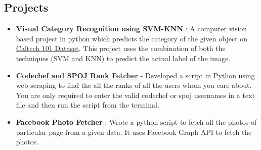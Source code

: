 \documentclass[margin, centered]{res}
\begin{document}
\begin{resume}
\section{Projects}
\begin{itemize}[leftmargin=*]
 \item \textbf{Visual Category Recognition using SVM-KNN} : A computer vision based project in python which predicts the category of the given object on \href {https://www.vision.caltech.edu/Image_Datasets/Caltech101/}{Caltech 101 Dataset}. This project uses the combination of both the techniques (SVM and KNN) to predict the actual label of the image.
 \item \textbf{\href{https://github.com/nickzuck}{Codechef and SPOJ Rank Fetcher}} - Developed a script in Python using web scraping to find the all the ranks of all the users whom you care about. You are only required to enter the valid codechef or spoj usernames in a text file and then run the script from the terminal.
 \item \textbf{Facebook Photo Fetcher} : Wrote a python script to fetch all the photos of particular page from a given data. It uses Facebook Graph API to fetch the photos.
 \
\end{itemize}



\end{resume}
\end{document}
